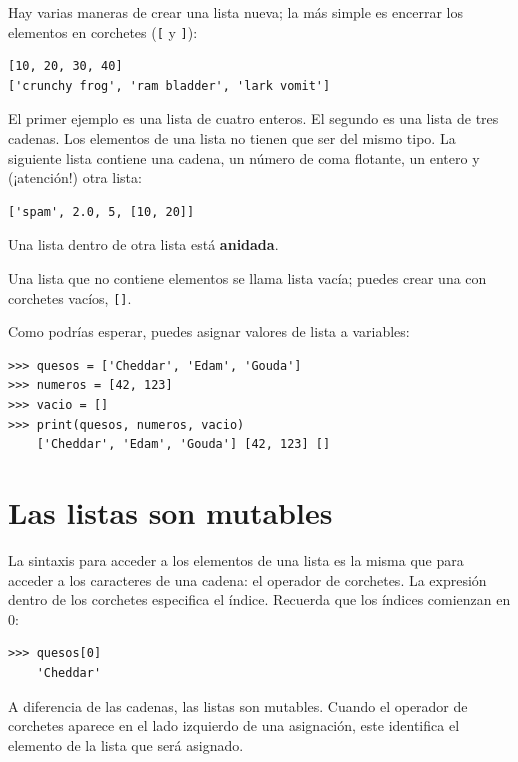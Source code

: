 \documentclass[10pt]{book}
\begin{document}
Hay varias maneras de crear una lista nueva; la más simple es
encerrar los elementos en corchetes (\verb"[" y \verb"]"):

\begin{verbatim}
[10, 20, 30, 40]
['crunchy frog', 'ram bladder', 'lark vomit']
\end{verbatim}
%
El primer ejemplo es una lista de cuatro enteros.  El segundo es una lista de
tres cadenas.  Los elementos de una lista no tienen que ser del mismo tipo.
La siguiente lista contiene una cadena, un número de coma flotante, un entero y
(¡atención!) otra lista:

\begin{verbatim}
['spam', 2.0, 5, [10, 20]]
\end{verbatim}
%
Una lista dentro de otra lista está {\bf anidada}.

Una lista que no contiene elementos se
llama lista vacía; puedes crear una con corchetes
vacíos, \verb"[]".

Como podrías esperar, puedes asignar valores de lista a variables:

\begin{verbatim}
>>> quesos = ['Cheddar', 'Edam', 'Gouda']
>>> numeros = [42, 123]
>>> vacio = []
>>> print(quesos, numeros, vacio)
    ['Cheddar', 'Edam', 'Gouda'] [42, 123] []
\end{verbatim}
%


\section{Las listas son mutables}
\label{mutable}

La sintaxis para acceder a los elementos de una lista es la misma que para
acceder a los caracteres de una cadena: el operador de corchetes.  La
expresión dentro de los corchetes especifica el índice.  Recuerda que los
índices comienzan en 0:

\begin{verbatim}
>>> quesos[0]
    'Cheddar'
\end{verbatim}
%
A diferencia de las cadenas, las listas son mutables.  Cuando el operador de corchetes aparece
en el lado izquierdo de una asignación, este identifica el elemento de la
lista que será asignado.
\end{document}
